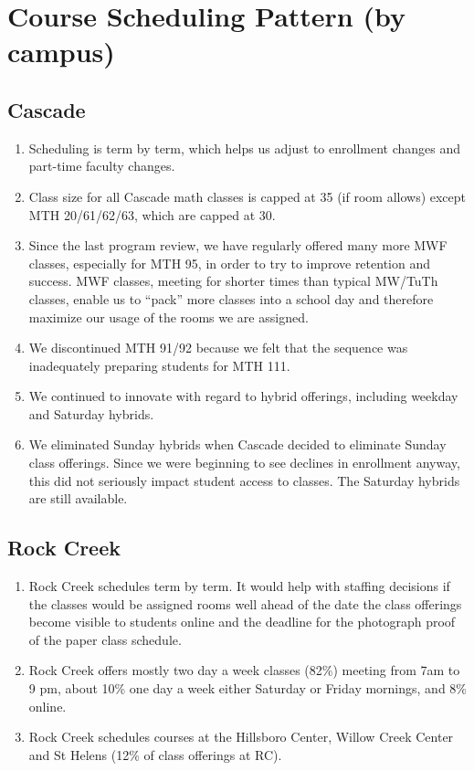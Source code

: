 \chapter{Course Scheduling Pattern (by campus)}\label{sec:app:courseschedule}
\section{Cascade}
\begin{enumerate}
	\item  Scheduling is term by term, which helps us adjust to enrollment changes and part-time faculty changes.
	\item  Class size for all Cascade math classes is capped at 35 (if room allows) except MTH 20/61/62/63, which are capped at 30.
	\item  Since the last program review, we have regularly offered many more MWF classes, especially for MTH 95, in order to try to improve retention and success.  MWF classes, meeting for shorter times than typical MW/TuTh classes, enable us to “pack” more classes into a school day and therefore maximize our usage of the rooms we are assigned.
	\item  We discontinued MTH 91/92 because we felt that the sequence was inadequately preparing students for MTH 111.
	\item  We continued to innovate with regard to hybrid offerings, including weekday and Saturday hybrids.
	\item  We eliminated Sunday hybrids when Cascade decided to eliminate Sunday class offerings.  Since we were beginning to see declines in enrollment anyway, this did not seriously impact student access to classes.  The Saturday hybrids are still available.
\end{enumerate}

\section{Rock Creek}
\begin{enumerate}
	\item Rock Creek schedules term by term.  It would help with staffing decisions if the classes would be assigned rooms well ahead of the date the class offerings become visible to students online and the deadline for the photograph proof of the paper class schedule.
	\item Rock Creek offers mostly two day a week classes (82\%) meeting from 7am to 9  pm, about 10\% one day a week either Saturday or Friday mornings, and 8\% online.
	\item Rock Creek schedules courses at the Hillsboro Center, Willow Creek Center and St Helens  (12\% of class offerings at RC).
\end{enumerate}


